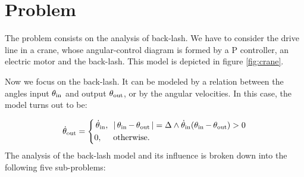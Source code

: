 \section*{Problem}
\label{sec:prob}
The problem consists on the analysis of back-lash. We have to consider the drive line in a crane, whose angular-control diagram is formed by a P controller, an electric motor and the back-lash. This model is depicted in figure \ref{fig:crane}.

Now we focus on the back-lash. It can be modeled by a relation between the angles input $\operatorname{\theta_\textrm{in}}$ and output $\operatorname{\theta_\textrm{out}}$, or by the angular velocities. In this case, the model turns out to be:

\begin{equation}
\label{eqsys}
\operatorname{\dot{\theta}_\textrm{out}}= 
    \left\{\begin{aligned} 
      & \operatorname{\dot{\theta}_\textrm{in}}, \enskip |\operatorname{\theta_\textrm{in}}-\operatorname{\theta_\textrm{out}}| = \Delta \wedge \operatorname{\dot{\theta}_\textrm{in}}(\operatorname{\theta_\textrm{in}}-\operatorname{\theta_\textrm{out}}) > 0\\
      & 0, \quad \textrm{ otherwise.}
    \end{aligned}\right.
\end{equation}
The analysis of the back-lash model and its influence is broken down into the following five sub-problems:
